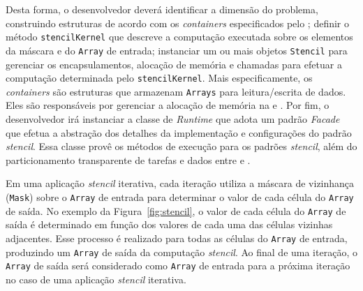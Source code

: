 Desta forma, o desenvolvedor deverá identificar a dimensão do problema,
construindo estruturas de acordo com os \textit{containers} especificados pelo
\fw; definir o método \texttt{stencilKernel} que descreve a computação executada
sobre os elementos da máscara e do \texttt{Array} de entrada; instanciar um ou
mais objetos \texttt{Stencil} para gerenciar os encapsulamentos, alocação de
memória e chamadas para efetuar a computação determinada pelo
\texttt{stencilKernel}. Mais especificamente, os \textit{containers} são
estruturas que armazenam \texttt{Arrays} para leitura/escrita de dados. Eles são
responsáveis por gerenciar a alocação de memória na \cpu e \gpu.
Por fim, o desenvolvedor irá instanciar a classe de \textit{Runtime} que adota
um padrão \textit{Facade} que efetua a abstração dos detalhes da implementação e
configurações do padrão \textit{stencil}. Essa classe provê os métodos de execução para
os padrões \textit{stencil}, além do particionamento transparente de tarefas e dados
entre \cpu e \gpu.

%
Em uma aplicação \textit{stencil} iterativa, cada iteração utiliza a máscara de
vizinhança (\texttt{Mask}) sobre o \texttt{Array} de entrada para determinar o
valor de cada célula do \texttt{Array} de saída. No exemplo da
Figura~\ref{fig:stencil}, o valor de cada célula do \texttt{Array} de saída é
determinado em função dos valores de cada uma das células vizinhas adjacentes.
Esse processo é realizado para todas as células do \texttt{Array} de entrada,
produzindo um \texttt{Array} de saída da computação \textit{stencil}. Ao final de uma
iteração, o \texttt{Array} de saída será considerado como \texttt{Array} de
entrada para a próxima iteração no caso de uma aplicação \textit{stencil} iterativa.

